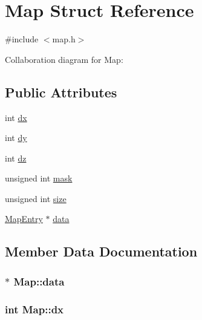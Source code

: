 \hypertarget{structMap}{}\section{Map Struct Reference}
\label{structMap}


{\ttfamily \#include $<$map.\+h$>$}



Collaboration diagram for Map\+:
\subsection*{Public Attributes}
\begin{DoxyCompactItemize}
\item 
int \hyperlink{structMap_a991fca09761e4ded5b69269776be11ee}{dx}
\item 
int \hyperlink{structMap_a64d19e88d54fa48e437044c88f674308}{dy}
\item 
int \hyperlink{structMap_a1f17ec06f672496c2582b60dce199f68}{dz}
\item 
unsigned int \hyperlink{structMap_a2211aadc9745a27b0e07a3af85989bd5}{mask}
\item 
unsigned int \hyperlink{structMap_a73754296f937e5d5fbf40b4be90c8e8c}{size}
\item 
\hyperlink{unionMapEntry}{Map\+Entry} $\ast$ \hyperlink{structMap_a8ef299519738b44dc1ae95c6410f0b56}{data}
\end{DoxyCompactItemize}


\subsection{Member Data Documentation}
\subsubsection[{\texorpdfstring{data}{data}}]{$\ast$ Map\+::data}\hypertarget{structMap_a8ef299519738b44dc1ae95c6410f0b56}{}\label{structMap_a8ef299519738b44dc1ae95c6410f0b56}
\subsubsection[{\texorpdfstring{dx}{dx}}]{\setlength{\rightskip}{0pt plus 5cm}int Map\+::dx}\hypertarget{structMap_a991fca09761e4ded5b69269776be11ee}{}\label{structMap_a991fca09761e4ded5b69269776be11ee}
